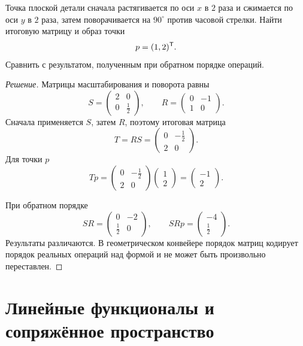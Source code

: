 \begin{problem}
Точка плоской детали сначала растягивается по оси \(x\) в \(2\) раза и сжимается по оси \(y\) в \(2\) раза, затем поворачивается на \(90^\circ\) против часовой стрелки. Найти итоговую матрицу и образ точки
\[
p=(1,2)^{\mathsf{T}}.
\]
Сравнить с результатом, полученным при обратном порядке операций.
\end{problem}

\begin{proof}[Решение]
Матрицы масштабирования и поворота равны
\[
S=
\begin{pmatrix}
2&0\\
0&\frac12
\end{pmatrix},
\qquad
R=
\begin{pmatrix}
0&-1\\
1&0
\end{pmatrix}.
\]
Сначала применяется \(S\), затем \(R\), поэтому итоговая матрица
\[
T=RS
=
\begin{pmatrix}
0&-\frac12\\
2&0
\end{pmatrix}.
\]
Для точки \(p\)
\[
Tp
=
\begin{pmatrix}
0&-\frac12\\
2&0
\end{pmatrix}
\begin{pmatrix}
1\\2
\end{pmatrix}
=
\begin{pmatrix}
-1\\2
\end{pmatrix}.
\]

При обратном порядке
\[
SR
=
\begin{pmatrix}
0&-2\\
\frac12&0
\end{pmatrix},
\qquad
SRp=
\begin{pmatrix}
-4\\
\frac12
\end{pmatrix}.
\]
Результаты различаются. В геометрическом конвейере порядок матриц кодирует порядок реальных операций над формой и не может быть произвольно переставлен.
\end{proof}

\section{Линейные функционалы и сопряжённое пространство}
\label{sec:dual-space}

